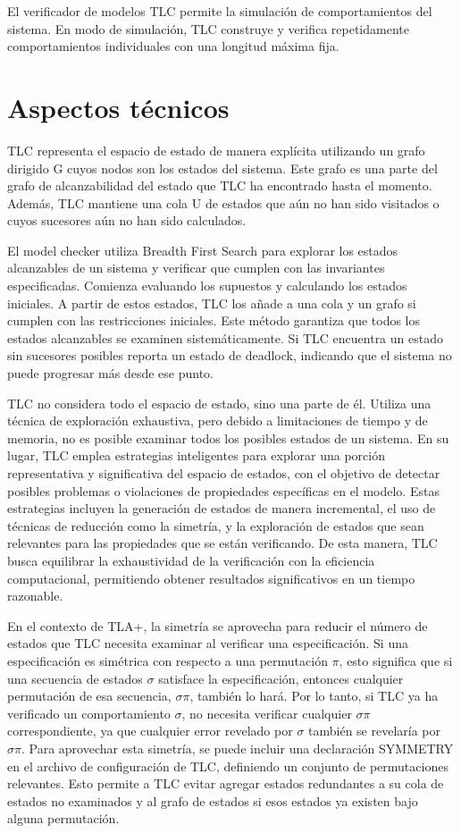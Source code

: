 \documentclass[runningheads]{llncs}
\begin{document}
El verificador de modelos TLC permite la simulación de comportamientos del sistema. En modo de simulación, TLC construye y verifica repetidamente comportamientos individuales con una longitud máxima fija.

\section{Aspectos técnicos}
TLC representa el espacio de estado de manera explícita utilizando un grafo dirigido G cuyos nodos son los estados del sistema. Este grafo es una parte del grafo de alcanzabilidad del estado que TLC ha encontrado hasta el momento. Además, TLC mantiene una cola U de estados que aún no han sido visitados o cuyos sucesores aún no han sido calculados.

El model checker utiliza Breadth First Search para explorar los estados alcanzables de un sistema y verificar que cumplen con las invariantes especificadas. Comienza evaluando los supuestos y calculando los estados iniciales. A partir de estos estados, TLC los añade a una cola y un grafo si cumplen con las restricciones iniciales. Este método garantiza que todos los estados alcanzables se examinen sistemáticamente. Si TLC encuentra un estado sin sucesores posibles reporta un estado de deadlock, indicando que el sistema no puede progresar más desde ese punto.

TLC no considera todo el espacio de estado, sino una parte de él. Utiliza una técnica de exploración exhaustiva, pero debido a limitaciones de tiempo y de memoria, no es posible examinar todos los posibles estados de un sistema. En su lugar, TLC emplea estrategias inteligentes para explorar una porción representativa y significativa del espacio de estados, con el objetivo de detectar posibles problemas o violaciones de propiedades específicas en el modelo. Estas estrategias incluyen la generación de estados de manera incremental, el uso de técnicas de reducción como la simetría, y la exploración de estados que sean relevantes para las propiedades que se están verificando. De esta manera, TLC busca equilibrar la exhaustividad de la verificación con la eficiencia computacional, permitiendo obtener resultados significativos en un tiempo razonable.

En el contexto de TLA+, la simetría se aprovecha para reducir el número de estados que TLC necesita examinar al verificar una especificación. Si una especificación es simétrica con respecto a una permutación $\pi$, esto significa que si una secuencia de estados $\sigma$ satisface la especificación, entonces cualquier permutación de esa secuencia, $\sigma\pi$, también lo hará. Por lo tanto, si TLC ya ha verificado un comportamiento $\sigma$, no necesita verificar cualquier $\sigma\pi$ correspondiente, ya que cualquier error revelado por $\sigma$ también se revelaría por $\sigma\pi$.
Para aprovechar esta simetría, se puede incluir una declaración SYMMETRY en el archivo de configuración de TLC, definiendo un conjunto de permutaciones relevantes. Esto permite a TLC evitar agregar estados redundantes a su cola de estados no examinados y al grafo de estados si esos estados ya existen bajo alguna permutación.
\end{document}
